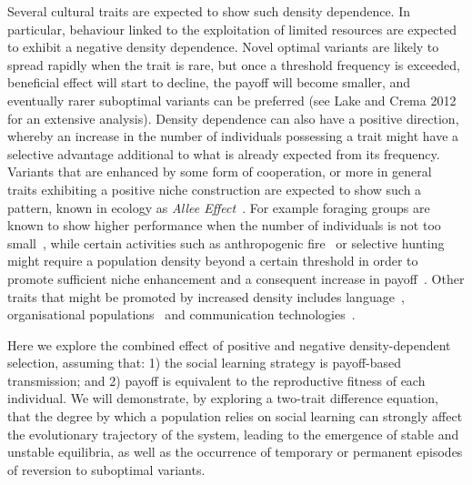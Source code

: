 \documentclass[preprint,authoryear]{elsarticle}
\begin{document}
Several cultural traits are expected to show such density dependence. In particular, behaviour linked to the exploitation of limited resources are expected to exhibit a negative density dependence. Novel optimal variants are likely to spread rapidly when the trait is rare, but once a threshold frequency is exceeded,  beneficial effect will start to decline, the payoff will become smaller, and eventually rarer suboptimal variants can be preferred (see Lake and Crema 2012 for an extensive analysis). Density dependence can also have a positive direction, whereby an increase in the number of individuals possessing a trait might have a selective advantage additional to what is already expected from its frequency. Variants that are enhanced by some form of cooperation, or more in general traits exhibiting a positive niche construction are expected to show such a pattern, known in ecology as \emph{Allee Effect}~\citep{allee1958}. For example foraging groups are known to show higher performance when the number of individuals is not too small~\citep{hill_and_hawkes_1983,janssen_and_hill_2014}, while certain activities such as anthropogenic fire~\citep{bird2013} or selective hunting~\citep{dods_2002} might require a population density beyond a certain threshold in order to promote sufficient niche enhancement and a consequent increase in payoff~\citep{rowley-conwy_and_layton_2011}. Other traits that might be promoted by increased density includes language~\citep{kandler2009}, organisational populations~\citep{caroll_and_hannan_1989} and communication technologies~\citep{van_slyke_perceived_2007}.

Here we explore the combined effect of positive and negative density-dependent selection, assuming that: 1) the social learning strategy is payoff-based transmission; and 2)  payoff is equivalent to the reproductive fitness of each individual. We will demonstrate, by exploring a two-trait difference equation, that the degree by which a population relies on social learning can strongly affect the evolutionary trajectory of the system, leading to the emergence of stable and unstable equilibria, as well as the occurrence of temporary or permanent episodes of reversion to suboptimal variants.
\end{document}

